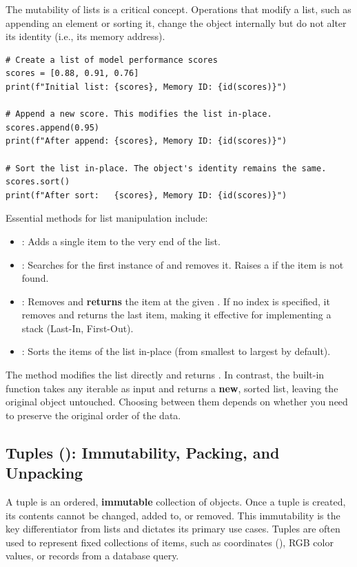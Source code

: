 The mutability of lists is a critical concept. Operations that modify a list, such as appending an element or sorting it, change the object internally but do not alter its identity (i.e., its memory address).

\begin{example}
\text{ }\begin{verbatim}
# Create a list of model performance scores
scores = [0.88, 0.91, 0.76]
print(f"Initial list: {scores}, Memory ID: {id(scores)}")

# Append a new score. This modifies the list in-place.
scores.append(0.95)
print(f"After append: {scores}, Memory ID: {id(scores)}")

# Sort the list in-place. The object's identity remains the same.
scores.sort()
print(f"After sort:   {scores}, Memory ID: {id(scores)}")
\end{verbatim}
\end{example}

Essential methods for list manipulation include:
\begin{itemize}
    \item \textbf{}: Adds a single item to the very end of the list.
    \item \textbf{}: Searches for the first instance of  and removes it. Raises a  if the item is not found.
    \item \textbf{}: Removes and \textbf{returns} the item at the given . If no index is specified, it removes and returns the last item, making it effective for implementing a stack (Last-In, First-Out).
    \item \textbf{}: Sorts the items of the list in-place (from smallest to largest by default).
\end{itemize}

\begin{remark}
The  method modifies the list directly and returns . In contrast, the built-in function  takes any iterable as input and returns a \textbf{new}, sorted list, leaving the original object untouched. Choosing between them depends on whether you need to preserve the original order of the data.
\end{remark}

\subsection{Tuples (): Immutability, Packing, and Unpacking}
\label{subsec:tuples}
A tuple is an ordered, \textbf{immutable} collection of objects. Once a tuple is created, its contents cannot be changed, added to, or removed. This immutability is the key differentiator from lists and dictates its primary use cases. Tuples are often used to represent fixed collections of items, such as coordinates (), RGB color values, or records from a database query.

